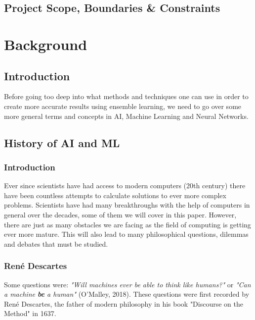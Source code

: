 \documentclass[
a4paper,
11pt,
english
]{report}
\begin{document}
\section{Project Scope, Boundaries \& Constraints}


\chapter{Background}

\section{Introduction}
Before going too deep into what methods and techniques one can use in order to create more accurate results using ensemble learning, we need to go over some more general terms and concepts in AI, Machine Learning and Neural Networks.

\section{History of AI and ML}
\subsection{Introduction}
Ever since scientists have had access to modern computers (20th century) there have been countless attempts to calculate solutions to ever more complex problems. Scientists have had many breakthroughs with the help of computers in general over the decades, some of them we will cover in this paper. However, there are just as many obstacles we are facing as the field of computing is getting ever more mature. This will also lead to many philosophical questions, dilemmas and debates that must be studied.

\subsection{René Descartes}
Some questions were: \textit{"Will machines ever be able to think like humans?"} or \textit{"Can a machine \textbf{be} a human"} (O'Malley, 2018). These questions were first recorded by René Descartes, the father of modern philosophy in his book "Discourse on the Method" in 1637.
\end{document}
